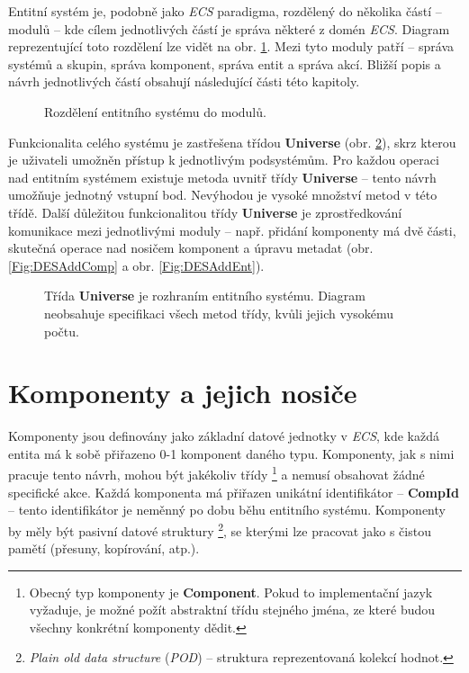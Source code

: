 Entitní systém je, podobně jako \emph{ECS} paradigma, rozdělený do několika částí -- modulů -- kde cílem jednotlivých částí je správa některé z domén \emph{ECS}. Diagram reprezentující toto rozdělení lze vidět na obr. \ref{Fig:DESModules}. Mezi tyto moduly patří -- správa systémů a skupin, správa komponent, správa entit a správa akcí. Bližší popis a návrh jednotlivých částí obsahují následující části této kapitoly.

\begin{figure}[H]
	\caption{Rozdělení entitního systému do modulů.}
	\label{Fig:DESModules}
\end{figure}

Funkcionalita celého systému je zastřešena třídou \textbf{Universe} (obr. \ref{Fig:DESUniverse}), skrz kterou je uživateli umožněn přístup k jednotlivým podsystémům. Pro každou operaci nad entitním systémem existuje metoda uvnitř třídy \textbf{Universe} -- tento návrh umožňuje jednotný vstupní bod. Nevýhodou je vysoké množství metod v této třídě. Další důležitou funkcionalitou třídy \textbf{Universe} je zprostředkování komunikace mezi jednotlivými moduly -- např. přidání komponenty má dvě části, skutečná operace nad nosičem komponent a úpravu metadat (obr. \ref{Fig:DESAddComp} a obr. \ref{Fig:DESAddEnt}). 

\begin{figure}[H]
	\caption{Třída \textbf{Universe} je rozhraním entitního systému. Diagram neobsahuje specifikaci všech metod třídy, kvůli jejich vysokému počtu.}
	\label{Fig:DESUniverse}
\end{figure}

\section{Komponenty a jejich nosiče}

Komponenty jsou definovány jako základní datové jednotky v \emph{ECS}, kde každá entita má k sobě přiřazeno 0-1 komponent daného typu. Komponenty, jak s nimi pracuje tento návrh, mohou být jakékoliv třídy \footnote{Obecný typ komponenty je \textbf{Component}. Pokud to implementační jazyk vyžaduje, je možné požít abstraktní třídu stejného jména, ze které budou všechny konkrétní komponenty dědit.} a nemusí obsahovat žádné specifické akce. Každá komponenta má přiřazen unikátní identifikátor -- \textbf{CompId} -- tento identifikátor je neměnný po dobu běhu entitního systému. Komponenty by měly být pasivní datové struktury \footnote{\emph{Plain old data structure} (\emph{POD}) -- struktura reprezentovaná kolekcí hodnot.}, se kterými lze pracovat jako s čistou pamětí (přesuny, kopírování, atp.).

